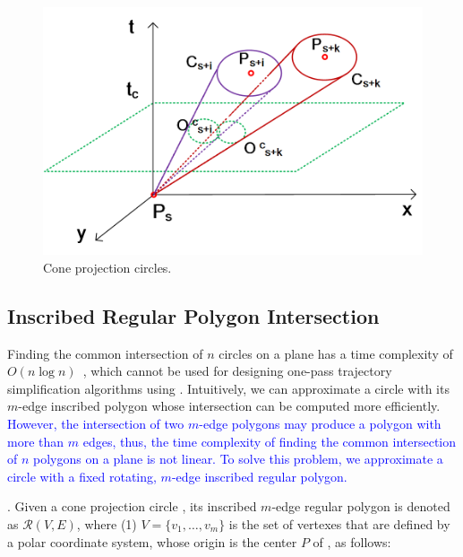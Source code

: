 \begin{figure}[tb!]
	\centering
	\includegraphics[scale=0.7]{figures/Fig-project-circle.png}
	\caption{\small Cone projection circles.}
	\vspace{-1ex}
	\label{fig:pcircle}
\end{figure}


\subsection{Inscribed Regular Polygon Intersection}
\label{subsec-RPI}

Finding the common intersection of $n$ circles on a plane has a time complexity of ${O(n\log n)}$~\cite{Shamos:Circle}, which cannot be used for designing one-pass trajectory simplification algorithms using \sed.
%
Intuitively, we can approximate a circle with its $m$-edge inscribed polygon {whose intersection can be computed more efficiently}. \textcolor{blue}{However, the intersection of two $m$-edge polygons may produce a polygon with more than $m$ edges, thus, the time complexity of finding the common intersection of $n$ polygons on a plane is not linear. To solve this problem, we approximate a circle with a fixed rotating, $m$-edge inscribed regular polygon.}

.
Given a cone projection circle , its inscribed $m$-edge regular polygon is denoted as $\mathcal{R}(V, E)$,
where (1) $V=\{v_1, \ldots, v_{m}\}$ is the set of vertexes that are defined by a polar coordinate system, whose origin is the center $P$ of \pcircle{}, as follows:


